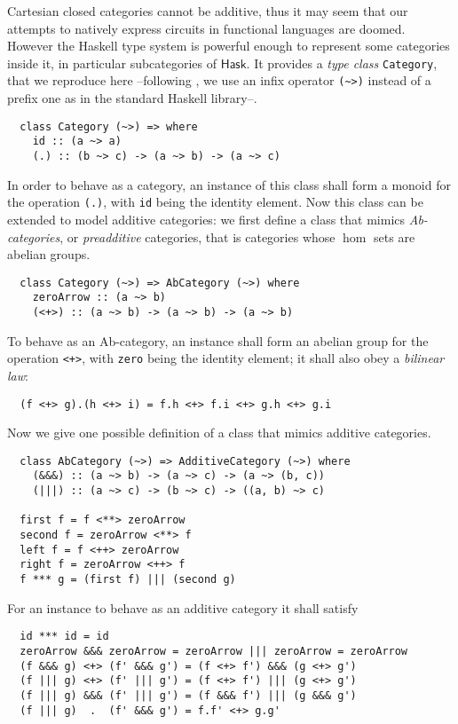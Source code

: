 Cartesian closed categories cannot be additive, thus it may seem that
our attempts to natively express circuits in functional languages are
doomed. However the Haskell type system is powerful enough to
represent some categories inside it, in particular subcategories of
$\mathsf{Hask}$. It provides a \emph{type class} \lstinline+Category+,
that we reproduce here --following \cite{Yor09}, we use an infix
operator \lstinline+(~>)+ instead of a prefix one as in the standard
Haskell library--.

\begin{lstlisting}
  class Category (~>) => where
    id :: (a ~> a)
    (.) :: (b ~> c) -> (a ~> b) -> (a ~> c)
\end{lstlisting}

In order to behave as a category, an instance of this class shall form
a monoid for the operation \lstinline+(.)+, with \lstinline+id+ being
the identity element. Now this class can be extended to model additive
categories: we first define a class that mimics \emph{Ab-categories},
or \emph{preadditive} categories, that is categories whose $\hom$ sets
are abelian groups.

\begin{lstlisting}
  class Category (~>) => AbCategory (~>) where
    zeroArrow :: (a ~> b)
    (<+>) :: (a ~> b) -> (a ~> b) -> (a ~> b)
\end{lstlisting}
To behave as an Ab-category, an instance shall form an abelian group
for the operation \lstinline|<+>|, with \lstinline+zero+ being the
identity element; it shall also obey a \emph{bilinear law}:
\begin{lstlisting}
  (f <+> g).(h <+> i) = f.h <+> f.i <+> g.h <+> g.i
\end{lstlisting}

Now we give one possible definition of a class that mimics additive
categories.
\begin{lstlisting}
  class AbCategory (~>) => AdditiveCategory (~>) where
    (&&&) :: (a ~> b) -> (a ~> c) -> (a ~> (b, c))
    (|||) :: (a ~> c) -> (b ~> c) -> ((a, b) ~> c)

  first f = f <**> zeroArrow
  second f = zeroArrow <**> f
  left f = f <++> zeroArrow
  right f = zeroArrow <++> f
  f *** g = (first f) ||| (second g)
\end{lstlisting}
For an instance to behave as an additive category it shall satisfy
\begin{lstlisting}
  id *** id = id
  zeroArrow &&& zeroArrow = zeroArrow ||| zeroArrow = zeroArrow
  (f &&& g) <+> (f' &&& g') = (f <+> f') &&& (g <+> g')
  (f ||| g) <+> (f' ||| g') = (f <+> f') ||| (g <+> g')
  (f ||| g) &&& (f' ||| g') = (f &&& f') ||| (g &&& g')
  (f ||| g)  .  (f' &&& g') = f.f' <+> g.g'
\end{lstlisting}


